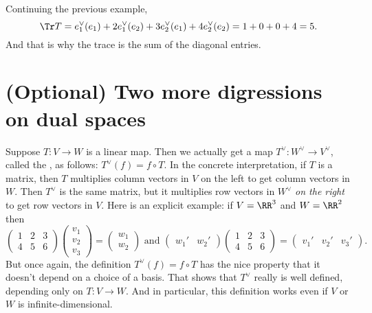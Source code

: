 \begin{example}
	Continuing the previous example,
	\[ \Tr T = e_1^\vee(e_1) + 2e_1^\vee(e_2) 
		+ 3e_2^\vee(e_1)  +4e_2^\vee(e_2)
		= 1 + 0 + 0 + 4 = 5. \]
	And that is why the trace is the sum of the diagonal entries.
\end{example}

\section{(Optional) Two more digressions on dual spaces}
\begin{itemize}
	\ii Suppose $T : V \to W$ is a linear map.
	Then we actually get a map $T^\vee : W^\vee \to V^\vee$,
	called the , as follows:
	$T^\vee(f) = f \circ T$.
	In the concrete interpretation, if $T$ is a matrix, then
	$T$ multiplies column vectors in $V$ on the left to get column vectors in $W$.
	Then $T^\vee$ is the same matrix, but it multiplies
	row vectors in $W^\vee$ \emph{on the right} to get row vectors in $V$.
	Here is an explicit example: if $V = \RR^3$ and $W = \RR^2$ then
	\[
		\left(
		\begin{array}{ccc}
			1 & 2 & 3 \\
			4 & 5 & 6
		\end{array}
		\right)
		\left(
		\begin{array}{c}
			v_1 \\ v_2 \\ v_3 
		\end{array}
		\right)
		= \left(
		\begin{array}{c}
			w_1 \\ w_2
		\end{array}
		\right) 
		\text{ and }
		\left(
		\begin{array}{cc}
			w_1' & w_2'
		\end{array}
		\right)
		\left(
		\begin{array}{ccc}
			1 & 2 & 3 \\
			4 & 5 & 6
		\end{array}
		\right)
		=
		\left(
		\begin{array}{ccc}
			v_1' & v_2' & v_3'
		\end{array}
		\right).
	\]
	But once again, the definition $T^\vee(f) = f \circ T$
	has the nice property that it doesn't depend on a choice of a basis.
	That shows that $T^\vee$ really is well defined, depending only on $T : V \to W$.
	And in particular, this definition works even if $V$ or $W$
	is infinite-dimensional.


\end{itemize}

